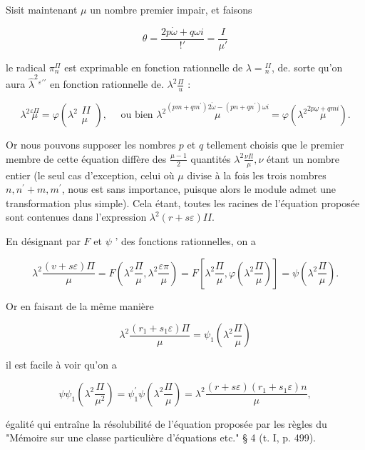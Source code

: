 \documentclass{article}
\begin{document}
Sisit maintenant \(\mu\) un nombre premier impair, et faisons

\[
\theta=\frac{2 p \dot{\omega}+q \omega i}{! \prime}=\frac{I}{\mu \prime}
\]

le radical \(\pi_{n}^{\Pi}\) est exprimable en fonction rationnelle de \(\lambda={ }_{n}^{I I}\), de. sorte qu'on aura \(\hat{\lambda}^{2}{ }^{\varepsilon \prime \prime}\) en fonction rationnelle de. \(\lambda^{2} \frac{\Pi}{u}\) :

\[
\lambda^{2} \stackrel{\varepsilon \Pi}{\mu}=\varphi\left(\lambda^{2} \begin{array}{l}
I I \\
\mu
\end{array}\right), \quad \text { ou bien } \lambda^{2} \stackrel{\left(p m+q m^{\prime}\right) 2 \grave{\omega}-\left(p n+q n^{\prime}\right) \omega i}{\mu}=\varphi\left(\lambda^{2} \stackrel{2 p \underline{\omega}+q m i}{\mu}\right) .
\]

Or nous pouvons supposer les nombres \(p\) et \(q\) tellement choisis que le premier membre de cette équation diffère des \(\frac{\mu-1}{2}\) quantités \(\lambda^{2} \frac{\nu I l}{\mu}, \nu\) étant un nombre entier (le seul cas d'exception, celui où \(\mu\) divise à la fois les trois nombres \(n, n^{\prime}+m, m^{\prime}\), nous est sans importance, puisque alors le module admet une transformation plus simple). Cela étant, toutes les racines de l'équation proposée sont contenues dans l'expression \(\lambda^{2}(r+s \varepsilon) I I\).

En désignant par \(F\) et \(\psi\) ' des fonctions rationnelles, on a

\[
\lambda^{2} \frac{(v+s \varepsilon) \Pi}{\mu}=F\left(\lambda^{2} \frac{\Pi}{\mu}, \lambda^{2} \frac{\varepsilon \pi}{\mu}\right)=F\left[\lambda^{2} \frac{\Pi}{\mu}, \varphi\left(\lambda^{2} \frac{\Pi}{\mu}\right)\right]=\psi\left(\lambda^{2} \frac{\Pi}{\mu}\right) .
\]

Or en faisant de la même manière

\[
\lambda^{2} \frac{\left(r_{1}+s_{1} \varepsilon\right) \Pi}{\mu}=\psi_{1}\left(\lambda^{2} \frac{\Pi}{\mu}\right)
\]

il est facile à voir qu'on a

\[
\psi \psi_{1}\left(\lambda^{2} \frac{\Pi}{\mu^{2}}\right)=\psi_{1}^{\prime} \psi\left(\lambda^{2} \frac{\Pi}{\mu}\right)=\lambda^{2} \frac{(r+s \varepsilon)\left(r_{1}+s_{1} \varepsilon\right) n}{\mu},
\]

égalité qui entraîne la résolubilité de l'équation proposée par les règles du "Mémoire sur une classe particulière d'équations etc." § 4 (t. I, p. 499).
\end{document}

